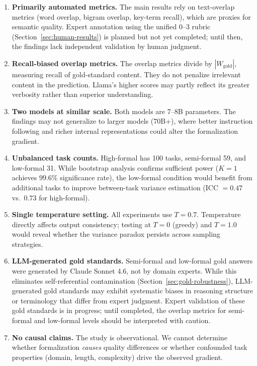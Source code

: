\documentclass[runningheads]{llncs}
\begin{document}
\begin{enumerate}
  \item \textbf{Primarily automated metrics.} The main results rely on text-overlap metrics (word overlap, bigram overlap, key-term recall), which are proxies for semantic quality. Expert annotation using the unified 0--3 rubric (Section~\ref{sec:human-results}) is planned but not yet completed; until then, the findings lack independent validation by human judgment.

  \item \textbf{Recall-biased overlap metrics.} The overlap metrics divide by $|W_{\text{gold}}|$, measuring recall of gold-standard content. They do not penalize irrelevant content in the prediction. Llama's higher scores may partly reflect its greater verbosity rather than superior understanding.

  \item \textbf{Two models at similar scale.} Both models are 7--8B parameters. The findings may not generalize to larger models (70B+), where better instruction following and richer internal representations could alter the formalization gradient.

  \item \textbf{Unbalanced task counts.} High-formal has 100 tasks, semi-formal 59, and low-formal 31. While bootstrap analysis confirms sufficient power ($K\!=\!1$ achieves $99.6\%$ significance rate), the low-formal condition would benefit from additional tasks to improve between-task variance estimation (ICC $= 0.47$ vs.\ $0.73$ for high-formal).

  \item \textbf{Single temperature setting.} All experiments use $T\!=\!0.7$. Temperature directly affects output consistency; testing at $T\!=\!0$ (greedy) and $T\!=\!1.0$ would reveal whether the variance paradox persists across sampling strategies.

  \item \textbf{LLM-generated gold standards.} Semi-formal and low-formal gold answers were generated by Claude Sonnet 4.6, not by domain experts. While this eliminates self-referential contamination (Section~\ref{sec:gold-robustness}), LLM-generated gold standards may exhibit systematic biases in reasoning structure or terminology that differ from expert judgment. Expert validation of these gold standards is in progress; until completed, the overlap metrics for semi-formal and low-formal levels should be interpreted with caution.

  \item \textbf{No causal claims.} The study is observational. We cannot determine whether formalization \emph{causes} quality differences or whether confounded task properties (domain, length, complexity) drive the observed gradient.
\end{enumerate}
\end{document}
